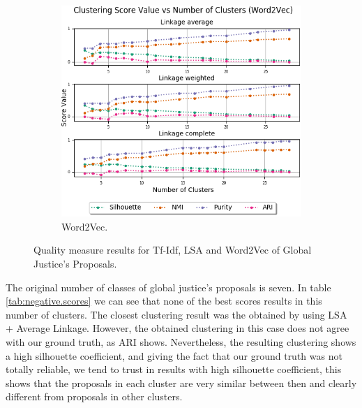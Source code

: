 \begin{figure}[!htp]
  \begin{subfigure}[b]{0.49\textwidth}   
  \centering 
  \includegraphics[width=\textwidth]{word2vec/clusters_score_word2vec_Global_Justice.png}
  \caption[]%
  {{\small Word2Vec.}}    
  \label{fig:gj.word2vec.score}
  \end{subfigure} 
\caption{Quality measure results for Tf-Idf, LSA and Word2Vec of Global Justice's Proposals.}
\label{fig:gj.scores}
\end{figure}

The original number of classes of global justice's proposals is seven. In table \ref{tab:negative.scores} we can see that none of the best scores results in this number of clusters. The closest clustering result was the obtained by using LSA + Average Linkage. However, the obtained clustering in this case does not agree with our ground truth, as ARI shows. Nevertheless, the resulting clustering shows a high silhouette coefficient, and giving the fact that our ground truth was not totally reliable, we tend to trust in results with high silhouette coefficient, this shows that the proposals in each cluster are very similar between then and clearly different from proposals in other clusters. 
\FloatBarrier
